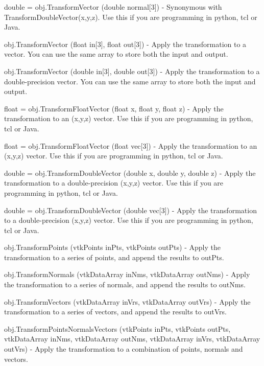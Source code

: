 \begin{DoxyItemize}
\item {\ttfamily double = obj.\-Transform\-Vector (double normal\mbox{[}3\mbox{]})} -\/ Synonymous with Transform\-Double\-Vector(x,y,z). Use this if you are programming in python, tcl or Java.  
\item {\ttfamily obj.\-Transform\-Vector (float in\mbox{[}3\mbox{]}, float out\mbox{[}3\mbox{]})} -\/ Apply the transformation to a vector. You can use the same array to store both the input and output.  
\item {\ttfamily obj.\-Transform\-Vector (double in\mbox{[}3\mbox{]}, double out\mbox{[}3\mbox{]})} -\/ Apply the transformation to a double-\/precision vector. You can use the same array to store both the input and output.  
\item {\ttfamily float = obj.\-Transform\-Float\-Vector (float x, float y, float z)} -\/ Apply the transformation to an (x,y,z) vector. Use this if you are programming in python, tcl or Java.  
\item {\ttfamily float = obj.\-Transform\-Float\-Vector (float vec\mbox{[}3\mbox{]})} -\/ Apply the transformation to an (x,y,z) vector. Use this if you are programming in python, tcl or Java.  
\item {\ttfamily double = obj.\-Transform\-Double\-Vector (double x, double y, double z)} -\/ Apply the transformation to a double-\/precision (x,y,z) vector. Use this if you are programming in python, tcl or Java.  
\item {\ttfamily double = obj.\-Transform\-Double\-Vector (double vec\mbox{[}3\mbox{]})} -\/ Apply the transformation to a double-\/precision (x,y,z) vector. Use this if you are programming in python, tcl or Java.  
\item {\ttfamily obj.\-Transform\-Points (vtk\-Points in\-Pts, vtk\-Points out\-Pts)} -\/ Apply the transformation to a series of points, and append the results to out\-Pts.  
\item {\ttfamily obj.\-Transform\-Normals (vtk\-Data\-Array in\-Nms, vtk\-Data\-Array out\-Nms)} -\/ Apply the transformation to a series of normals, and append the results to out\-Nms.  
\item {\ttfamily obj.\-Transform\-Vectors (vtk\-Data\-Array in\-Vrs, vtk\-Data\-Array out\-Vrs)} -\/ Apply the transformation to a series of vectors, and append the results to out\-Vrs.  
\item {\ttfamily obj.\-Transform\-Points\-Normals\-Vectors (vtk\-Points in\-Pts, vtk\-Points out\-Pts, vtk\-Data\-Array in\-Nms, vtk\-Data\-Array out\-Nms, vtk\-Data\-Array in\-Vrs, vtk\-Data\-Array out\-Vrs)} -\/ Apply the transformation to a combination of points, normals and vectors.  

\end{DoxyItemize}
